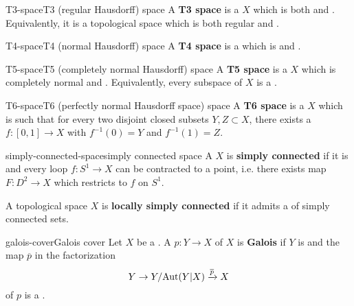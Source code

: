 \begin{topic}{T3-space}{T3 (regular Hausdorff) space}
    A \textbf{T3 space} is a  $X$ which is both  and . Equivalently, it is a topological space which is both regular and .
\end{topic}

\begin{topic}{T4-space}{T4 (normal Hausdorff) space}
    A \textbf{T4 space} is a  which is  and .
\end{topic}

\begin{topic}{T5-space}{T5 (completely normal Hausdorff) space}
    A \textbf{T5 space} is a  $X$ which is completely normal and . Equivalently, every subspace of $X$ is a .
\end{topic}

\begin{topic}{T6-space}{T6 (perfectly normal Hausdorff space) space}
    A \textbf{T6 space} is a  $X$ which is  such that for every two disjoint closed subsets $Y, Z \subset X$, there exists a  $f : [0, 1] \to X$ with $f^{-1}(0) = Y$ and $f^{-1}(1) = Z$.
\end{topic}

\begin{topic}{simply-connected-space}{simply connected space}
    A  $X$ is \textbf{simply connected} if it is  and every loop $f : S^1 \to X$ can be contracted to a point, i.e. there exists map $F : D^2 \to X$ which restricts to $f$ on $S^1$.
    
    A topological space $X$ is \textbf{locally simply connected} if it admits a  of simply connected sets.
\end{topic}

\begin{topic}{galois-cover}{Galois cover}
    Let $X$ be a . A  $p : Y \to X$ of $X$ is \textbf{Galois} if $Y$ is  and the map $\overline{p}$ in the factorization
    \[ Y \to Y / \textup{Aut}(Y|X) \xrightarrow{\overline{p}} X \]
    of $p$ is a .
\end{topic}

